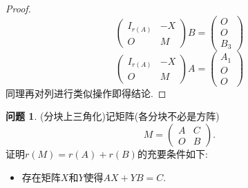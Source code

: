 \documentclass[11pt]{ctexart}
\theoremstyle{definition}
\newtheorem{qqq}{问题}[section]
\numberwithin{equation}{section}
\begin{document}
\begin{proof}
$$\begin{pmatrix}
            I_{r(A)}&-X\\O&M
        \end{pmatrix}B=\begin{pmatrix}
            O\\O\\B_3
        \end{pmatrix}$$
        $$\begin{pmatrix}
            I_{r(A)}&-X\\O&M
        \end{pmatrix}A=\begin{pmatrix}
            A_1\\O\\O
        \end{pmatrix}$$
        同理再对列进行类似操作即得结论.
\end{proof}
\begin{qqq}
    (分块上三角化)记矩阵(各分块不必是方阵)$$M=\begin{pmatrix}
        A&C\\O&B
    \end{pmatrix}.$$
    证明$r(M)=r(A)+r(B)$的充要条件如下:
    \begin{itemize}
        \item 存在矩阵$X$和$Y$使得$AX+YB=C.$
    \end{itemize}
\end{qqq}
\end{document}

